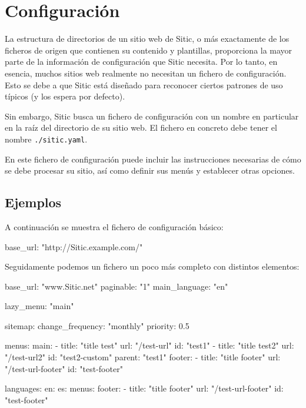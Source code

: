 
\section{Configuración}

La estructura de directorios de un sitio web de Sitic, o más exactamente de los ficheros de origen
que contienen su contenido y plantillas, proporciona la mayor parte de la información de configuración
que Sitic necesita. Por lo tanto, en esencia, muchos sitios web realmente no necesitan un fichero de
configuración. Esto se debe a que Sitic está diseñado para reconocer ciertos patrones de uso típicos
(y los espera por defecto).

Sin embargo, Sitic busca un fichero de configuración con un nombre en particular en la raíz del directorio
de su sitio web. El fichero en concreto debe tener el nombre \texttt{./sitic.yaml}.

En este fichero de configuración puede incluir las instrucciones necesarias de cómo se
debe procesar su sitio, así como definir sus menús y establecer otras opciones.

\subsection{Ejemplos}

A continuación se muestra el fichero de configuración básico:

\begin{yamlcode}
    base_url: "http://Sitic.example.com/"
\end{yamlcode}

Seguidamente podemos un fichero un poco más completo con distintos elementos:

\begin{yamlcode}
    base_url: "www.Sitic.net"
    paginable: "1"
    main_language: "en"

    lazy_menu: "main"

    sitemap:
        change_frequency: "monthly"
        priority: 0.5

    menus:
        main:
            - title: "title test"
              url: "/test-url"
              id: "test1"
            - title: "title test2"
              url: "/test-url2"
              id: "test2-custom"
              parent: "test1"
        footer:
            - title: "title footer"
              url: "/test-url-footer"
              id: "test-footer"


    languages:
        en:
        es:
            menus:
                footer:
                    - title: "title footer"
                      url: "/test-url-footer"
                      id: "test-footer"
\end{yamlcode}

